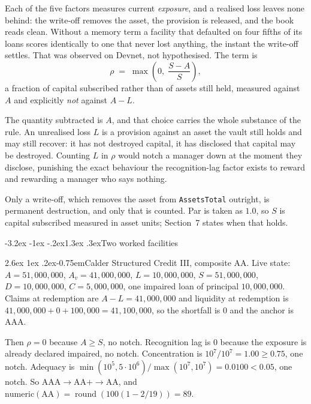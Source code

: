 \documentclass[11pt]{article}
\makeatletter
\renewcommand\subsection{\@startsection{subsection}{2}{\z@}%
  {-3.2ex \@plus -1ex \@minus -.2ex}{1.3ex \@plus .3ex}{\normalfont\large\bfseries}}
\renewcommand\paragraph{\@startsection{paragraph}{4}{\z@}%
  {2.6ex \@plus 1ex \@minus .2ex}{-0.75em}{\normalfont\normalsize\bfseries}}
\theoremstyle{orma}
\theoremstyle{ormaupright}
\DeclareMathOperator{\round}{round}
\makeatother
\begin{document}
Each of the five factors measures current \emph{exposure}, and a realised loss leaves none
behind: the write-off removes the asset, the provision is released, and the book reads
clean. Without a memory term a facility that defaulted on four fifths of its loans scores
identically to one that never lost anything, the instant the write-off settles. That was
observed on Devnet, not hypothesised. The term is
\begin{equation}
  \rho \;=\; \max\left( 0,\; \frac{S - A}{S} \right),
\end{equation}
a fraction of capital subscribed rather than of assets still held, measured against $A$ and
explicitly \emph{not} against $A - L$.

The quantity subtracted is $A$, and that choice carries the whole substance of the rule. An
unrealised loss $L$ is a provision against an asset the vault still holds and may still
recover: it has not destroyed capital, it has disclosed that capital may be destroyed.
Counting $L$ in $\rho$ would notch a manager down at the moment they disclose, punishing the
exact behaviour the recognition-lag factor exists to reward and rewarding a manager who says
nothing.

Only a write-off, which removes the asset from \texttt{AssetsTotal} outright, is
permanent destruction, and only that is counted. Par is taken as $1.0$, so $S$ is capital
subscribed measured in asset units; Section~7 states when that holds.

\subsection{Two worked facilities}

\paragraph{Calder Structured Credit III, composite AA.} Live state: $A = 51{,}000{,}000$,
$A_v = 41{,}000{,}000$, $L = 10{,}000{,}000$, $S = 51{,}000{,}000$, $D = 10{,}000{,}000$,
$C = 5{,}000{,}000$, one impaired loan of principal $10{,}000{,}000$. Claims at redemption
are $A - L = 41{,}000{,}000$ and liquidity at redemption is
$41{,}000{,}000 + 0 + 100{,}000 = 41{,}100{,}000$, so the shortfall is $0$ and the anchor is
AAA.

Then $\rho = 0$ because $A \geq S$, no notch. Recognition lag is $0$ because the
exposure is already declared impaired, no notch. Concentration is
$10^{7}/10^{7} = 1.00 \geq 0.75$, one notch. Adequacy is
$\min(10^{5}, 5 \cdot 10^{6}) / \max(10^{7}, 10^{7}) = 0.0100 < 0.05$, one notch. So
$\text{AAA} \rightarrow \text{AA+} \rightarrow \text{AA}$, and
$\mathrm{numeric}(\text{AA}) = \round(100(1 - 2/19)) = 89$.
\end{document}
